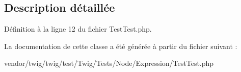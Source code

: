\subsection{Description détaillée}


Définition à la ligne 12 du fichier Test\+Test.\+php.



La documentation de cette classe a été générée à partir du fichier suivant \+:\begin{DoxyCompactItemize}
\item 
vendor/twig/twig/test/\+Twig/\+Tests/\+Node/\+Expression/Test\+Test.\+php\end{DoxyCompactItemize}
